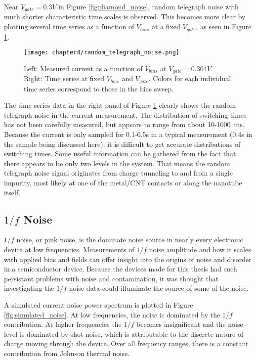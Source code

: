Near $V_{gate} = 0.3V$ in Figure \ref{fig:diamond_noise}, random telegraph noise with much shorter characteristic time scales is observed. This becomes more clear by plotting several time series as a function of $V_{bias}$ at a fixed $V_{gate}$, as seen in Figure \ref{fig:rts_bias}.

\begin{figure}
    \centering
    \texttt{[image: chapter4/random\_telegraph\_noise.png]}
    \caption{Left: Measured current as a function of $V_{bias}$ at $V_{gate} = 0.304V$. Right: Time series at fixed $V_{bias}$ and $V_{gate}$. Colors for each individual time series correspond to those in the bias sweep.}
    \label{fig:rts_bias}
\end{figure}

The time series data in the right panel of Figure \ref{fig:rts_bias} clearly shows the random telegraph noise in the current measurement. The distribution of switching times has not been carefully measured, but appears to range from about 10-\SI{1000}{\milli\second}. Because the current is only sampled for 0.1-0.5s in a typical measurement (0.4s in the sample being discussed here), it is difficult to get accurate distributions of switching times. Some useful information can be gathered from the fact that there appears to be only two levels in the system. That means the random telegraph noise signal originates from charge tunneling to and from a single impurity, most likely at one of the metal/CNT contacts or along the nanotube itself.

\subsection{$1/f$ Noise}

$1/f$ noise, or pink noise, is the dominate noise source in nearly every electronic device at low frequencies. Measurements of $1/f$ noise amplitude and how it scales with applied bias and fields can offer insight into the origins of noise and disorder in a semiconductor device. Because the devices made for this thesis had such persistant problems with noise and contamination, it was thought that investigating the $1/f$ noise data could illuminate the source of some of the noise.

A simulated current noise power spectrum is plotted in Figure \ref{fig:simulated_noise}. At low frequencies, the noise is dominated by the $1/f$ contribution. At higher frequencies the $1/f$ becomes insignificant and the noise level is dominated by shot noise, which is attributable to the discrete nature of charge moving through the device. Over all frequency ranges, there is a constant contribution from Johnson thermal noise.

